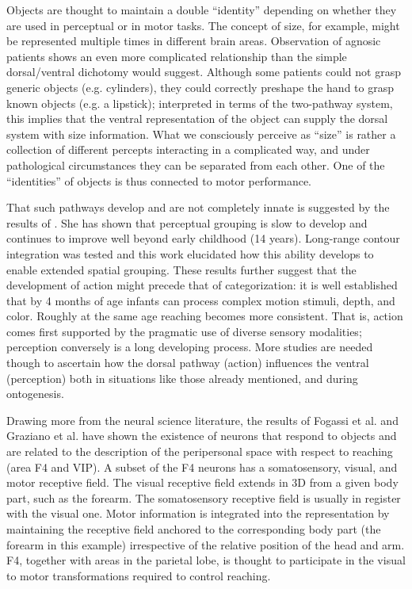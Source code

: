 
Objects are thought to maintain a double ``identity'' depending on
whether they are used in perceptual or in motor tasks. The concept of
size, for example, might be represented multiple times in different
brain areas. Observation of agnosic
patients \cite{jeannerod97cognitive} shows an even more complicated
relationship than the simple dorsal/ventral dichotomy would
suggest.  Although some patients could not grasp generic objects
(e.g. cylinders), they could correctly preshape the hand to grasp
known objects (e.g. a lipstick); interpreted in terms of the
two-pathway system, this implies that the ventral representation of
the object can supply the dorsal system with size information. What we
consciously perceive as ``size'' is rather a collection of different
percepts interacting in a complicated way, and under pathological
circumstances they can be separated from each other. One of the
``identities'' of objects is thus connected to motor performance.

That such pathways develop and are not completely innate is suggested
by the results of \cite{kovacs00human}. She has shown that
perceptual grouping is slow to develop and continues to improve well
beyond early childhood (14 years). Long-range contour integration was
tested and this work elucidated how this ability develops to enable
extended spatial grouping. These results further suggest that the
development of action might precede that of categorization: it is well
established that by 4 months of age infants can process complex
motion stimuli, depth, and color.  Roughly at the same age reaching
becomes more consistent.  That is, action comes first
supported by the pragmatic use of diverse sensory modalities;
perception conversely is a long developing process. More studies are
needed though to ascertain how the dorsal pathway (action) influences
the ventral (perception) both in situations like those
already mentioned, and during ontogenesis.

Drawing more from the neural science literature, the results of Fogassi et al.
\cite{fogassi96coding} and Graziano et al. \cite{graziano-hu-gross-1997} have 
shown the existence of neurons that respond to objects and are related to the
description of the peripersonal space with respect to reaching (area F4 and VIP).
A subset of the F4 neurons has a somatosensory, visual, and motor receptive
field. The visual receptive field extends in 3D from a given body part, such
as the forearm. The somatosensory receptive field is usually in register with
the visual one. Motor information is integrated into the representation 
by maintaining the receptive field anchored to the corresponding body part
(the forearm in this example) irrespective of the relative position of the
head and arm. F4, together with areas in the parietal lobe, is thought to 
participate in the visual to motor transformations required to control 
reaching.

